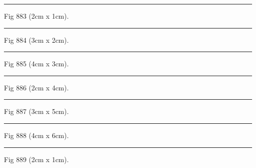 \documentclass[a4paper,11pt]{article}
\begin{document}
\begin{swarmwrap}%
  \begin{minipage}[t]{2cm}
    \centering
    \rule{\linewidth}{1cm}
    {\footnotesize Fig 883 (2cm x 1cm).}
  \end{minipage}%
\end{swarmwrap}%
\swarmwrapnext
\lipsum[133]%

\begin{swarmwrap}%
  \begin{minipage}[t]{3cm}
    \centering
    \rule{\linewidth}{2cm}
    {\footnotesize Fig 884 (3cm x 2cm).}
  \end{minipage}%
\end{swarmwrap}%
\swarmwrapnext
\lipsum[134]%

\begin{swarmwrap}%
  \begin{minipage}[t]{4cm}
    \centering
    \rule{\linewidth}{3cm}
    {\footnotesize Fig 885 (4cm x 3cm).}
  \end{minipage}%
\end{swarmwrap}%
\swarmwrapnext
\lipsum[135]%

\begin{swarmwrap}%
  \begin{minipage}[t]{2cm}
    \centering
    \rule{\linewidth}{4cm}
    {\footnotesize Fig 886 (2cm x 4cm).}
  \end{minipage}%
\end{swarmwrap}%
\swarmwrapnext
\lipsum[136]%

\begin{swarmwrap}%
  \begin{minipage}[t]{3cm}
    \centering
    \rule{\linewidth}{5cm}
    {\footnotesize Fig 887 (3cm x 5cm).}
  \end{minipage}%
\end{swarmwrap}%
\swarmwrapnext
\lipsum[137]%

\begin{swarmwrap}%
  \begin{minipage}[t]{4cm}
    \centering
    \rule{\linewidth}{6cm}
    {\footnotesize Fig 888 (4cm x 6cm).}
  \end{minipage}%
\end{swarmwrap}%
\swarmwrapnext
\lipsum[138]%

\begin{swarmwrap}%
  \begin{minipage}[t]{2cm}
    \centering
    \rule{\linewidth}{1cm}
    {\footnotesize Fig 889 (2cm x 1cm).}
  \end{minipage}%
\end{swarmwrap}%
\swarmwrapnext
\lipsum[139]%
\end{document}
